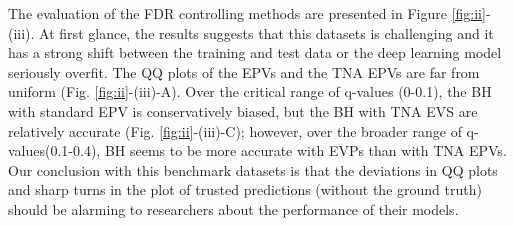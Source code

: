 \documentclass{article}
\begin{document}
The evaluation of the FDR controlling methods are presented in Figure \ref{fig:ii}-(iii). At first glance, the results suggests that this datasets is challenging and it  has a strong shift between the training and test data or the deep learning model seriously overfit. The QQ plots of the EPVs and the TNA EPVs are far from uniform (Fig. \ref{fig:ii}-(iii)-A). Over the critical range of q-values (0-0.1), the BH with standard EPV is conservatively biased, but the BH with TNA EVS are relatively accurate (Fig. \ref{fig:ii}-(iii)-C); however, over the broader range of q-values(0.1-0.4), BH seems to be more accurate with EVPs than with TNA EPVs. Our conclusion with this benchmark datasets is that the deviations in QQ plots and sharp turns in the plot of trusted predictions (without the ground truth) should be alarming to researchers about the performance of their models. 
\end{document}
